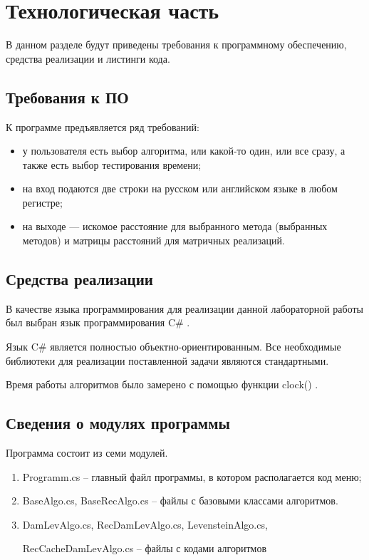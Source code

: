 \chapter{Технологическая часть}

В данном разделе будут приведены требования к программному обеспечению, средства реализации и листинги кода.

\section{Требования к ПО}

К программе предъявляется ряд требований:
\begin{itemize}
	\item у пользователя есть выбор алгоритма, или какой-то один, или все сразу, а также есть выбор тестирования времени;
	\item на вход подаются две строки на русском или английском языке в любом регистре;
	\item на выходе — искомое расстояние для выбранного метода (выбранных методов) и матрицы расстояний для матричных реализаций.
\end{itemize}

\section{Средства реализации}

В качестве языка программирования для реализации данной лабораторной работы был выбран язык программирования C\# \cite{sharplang}. 

Язык C\# является полностью объектно-ориентированным. 
Все необходимые библиотеки для реализации поставленной задачи являются стандартными.


Время работы алгоритмов было замерено с помощью функции clock() \cite{cpplangtime}.

\section{Сведения о модулях программы}
Программа состоит из семи модулей.
\begin{enumerate}
	\item Programm.cs -- главный файл программы, в котором располагается код меню;
	\item BaseAlgo.cs, BaseRecAlgo.cs -- файлы с базовыми классами алгоритмов.
	\item DamLevAlgo.cs, RecDamLevAlgo.cs, LevensteinAlgo.cs,
	
	RecCacheDamLevAlgo.cs -- файлы с кодами алгоритмов
\end{enumerate}


